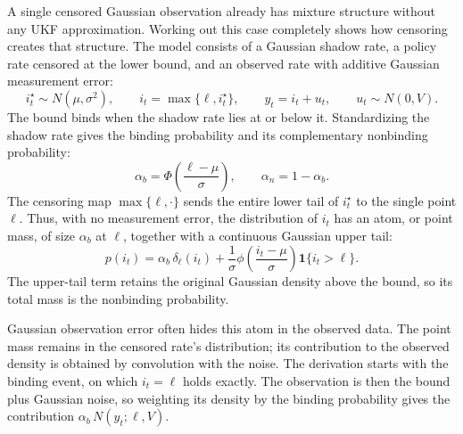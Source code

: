 \documentclass[11pt]{article}
\begin{document}
A single censored Gaussian observation already has mixture structure without any UKF approximation. Working out this case completely shows how censoring creates that structure. The model consists of a Gaussian shadow rate, a policy rate censored at the lower bound, and an observed rate with additive Gaussian measurement error:
\begin{equation}\label{eq:29}
 i_t^\star\sim N(\mu,\sigma^2),
 \qquad i_t=\max\{\ell,i_t^\star\},
 \qquad y_t=i_t+u_t,
 \qquad u_t\sim N(0,V).
\end{equation}
The bound binds when the shadow rate lies at or below it. Standardizing the shadow rate gives the binding probability and its complementary nonbinding probability:
\begin{equation}\label{eq:30}
 \alpha_b=\Phi\!\left(\frac{\ell-\mu}{\sigma}\right),
 \qquad
 \alpha_n=1-\alpha_b.
\end{equation}
The censoring map $\max\{\ell,\cdot\}$ sends the entire lower tail of $i_t^\star$ to the single point $\ell$. Thus, with no measurement error, the distribution of $i_t$ has an atom, or point mass, of size $\alpha_b$ at $\ell$, together with a continuous Gaussian upper tail:
\begin{equation}\label{eq:31}
 p(i_t)=\alpha_b\,\delta_\ell(i_t)
 +\frac{1}{\sigma}\phi\!\left(\frac{i_t-\mu}{\sigma}\right)
  \mathbf 1\{i_t>\ell\}.
\end{equation}
The upper-tail term retains the original Gaussian density above the bound, so its total mass is the nonbinding probability.

Gaussian observation error often hides this atom in the observed data. The point mass remains in the censored rate's distribution; its contribution to the observed density is obtained by convolution with the noise. The derivation starts with the binding event, on which $i_t=\ell$ holds exactly. The observation is then the bound plus Gaussian noise, so weighting its density by the binding probability gives the contribution $\alpha_b\,N(y_t;\ell,V)$.
\end{document}
